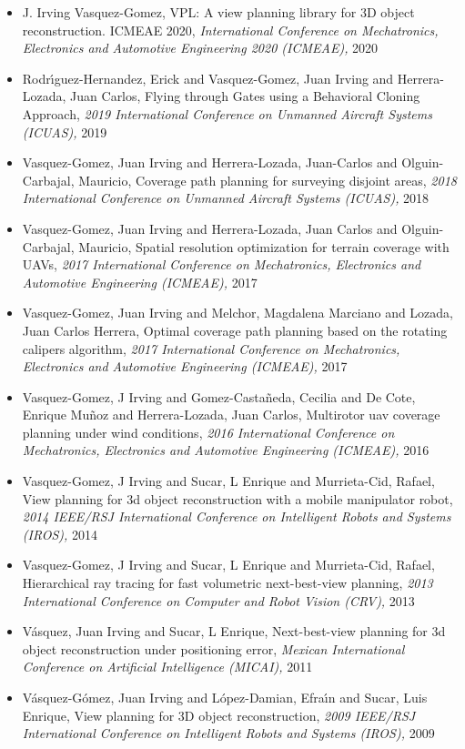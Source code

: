 \begin{itemize} 
\item J. Irving Vasquez-Gomez, VPL: A view planning library for 3D object reconstruction. ICMEAE 2020, \textit{ International Conference on Mechatronics, Electronics and Automotive Engineering 2020 (ICMEAE),} 2020 
\item Rodr{\'\i}guez-Hernandez, Erick and Vasquez-Gomez, Juan Irving and Herrera-Lozada, Juan Carlos, Flying through Gates using a Behavioral Cloning Approach, \textit{ 2019 International Conference on Unmanned Aircraft Systems (ICUAS),} 2019 
\item Vasquez-Gomez, Juan Irving and Herrera-Lozada, Juan-Carlos and Olguin-Carbajal, Mauricio, Coverage path planning for surveying disjoint areas, \textit{ 2018 International Conference on Unmanned Aircraft Systems (ICUAS),} 2018 
\item Vasquez-Gomez, Juan Irving and Herrera-Lozada, Juan Carlos and Olguin-Carbajal, Mauricio, Spatial resolution optimization for terrain coverage with UAVs, \textit{ 2017 International Conference on Mechatronics, Electronics and Automotive Engineering (ICMEAE),} 2017 
\item Vasquez-Gomez, Juan Irving and Melchor, Magdalena Marciano and Lozada, Juan Carlos Herrera, Optimal coverage path planning based on the rotating calipers algorithm, \textit{ 2017 International Conference on Mechatronics, Electronics and Automotive Engineering (ICMEAE),} 2017 
\item Vasquez-Gomez, J Irving and Gomez-Casta{\~n}eda, Cecilia and De Cote, Enrique Mu{\~n}oz and Herrera-Lozada, Juan Carlos, Multirotor uav coverage planning under wind conditions, \textit{ 2016 International Conference on Mechatronics, Electronics and Automotive Engineering (ICMEAE),} 2016 
\item Vasquez-Gomez, J Irving and Sucar, L Enrique and Murrieta-Cid, Rafael, View planning for 3d object reconstruction with a mobile manipulator robot, \textit{ 2014 IEEE/RSJ International Conference on Intelligent Robots and Systems (IROS),} 2014 
\item Vasquez-Gomez, J Irving and Sucar, L Enrique and Murrieta-Cid, Rafael, Hierarchical ray tracing for fast volumetric next-best-view planning, \textit{ 2013 International Conference on Computer and Robot Vision (CRV),} 2013 
\item V{\'a}squez, Juan Irving and Sucar, L Enrique, Next-best-view planning for 3d object reconstruction under positioning error, \textit{ Mexican International Conference on Artificial Intelligence (MICAI),} 2011 
\item V{\'a}squez-G{\'o}mez, Juan Irving and L{\'o}pez-Damian, Efra{\'\i}n and Sucar, Luis Enrique, View planning for 3D object reconstruction, \textit{ 2009 IEEE/RSJ International Conference on Intelligent Robots and Systems (IROS),} 2009 
\end{itemize} 
